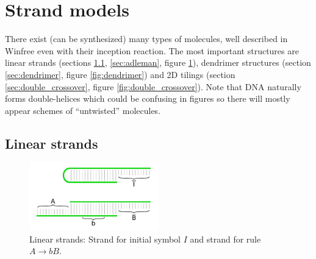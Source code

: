 
\section{Strand models}
	
	There exist (can be synthesized) many types of molecules, well described in Winfree \cite{winfree_phd} even with their inception reaction. The most important structures are linear strands (sections \ref{sec:lin_strands}, \ref{sec:adleman}, figure \ref{fig:linear}), dendrimer structures (section \ref{sec:dendrimer}, figure \ref{fig:dendrimer}) and 2D tilings (section \ref{sec:double_crossover}, figure \ref{fig:double_crossover}). Note that DNA naturally forms double-helices which could be confusing in figures so there will mostly appear schemes of ``untwisted'' molecules. %
	
	
	
	\subsection{Linear strands}
	\label{sec:lin_strands}
		
		\begin{figure}[H]
		\begin{center}
			\includegraphics[width=0.502\textwidth]{./figures/strand_types/linear.pdf} %
			\caption{Linear strands: Strand for initial symbol $I$ and strand for rule $A\rightarrow bB$.}
			\label{fig:linear}
		\end{center}
		\end{figure}
		
